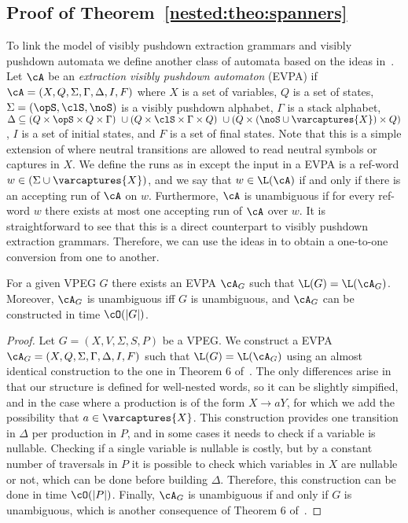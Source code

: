 
\subsection{Proof of Theorem~\ref{nested:theo:spanners}}

To link the model of visibly pushdown extraction grammars and visibly pushdown automata we define another class of automata based on the ideas in~\cite{liatpaper}. Let $\cA$ be an {\em extraction visibly pushdown automaton} (EVPA) if $\cA = (X,Q,\Sigma,\Gamma,\Delta,I,F)$ where $X$ is a set of variables, $Q$ is a set of states, $\Sigma = (\opS,\clS,\noS)$ is a visibly pushdown alphabet, $\Gamma$ is a stack alphabet, $\Delta \subseteq
(Q \times \opS \times Q \times \Gamma) \ \cup (Q \times \clS \times \Gamma \times Q) \ \cup (Q \times (\noS\cup\varcaptures{X}) \times Q)$, $I$ is a set of initial states, and $F$ is a set of final states. Note that this is a simple extension of \vpa where neutral transitions are allowed to read neutral symbols or captures in $X$. We define the runs as in \vpa except the input in a EVPA is a ref-word $w\in(\Sigma\cup\varcaptures{X})$, and we say that $w\in\L(\cA)$ if and only if there is an accepting run of $\cA$ on $w$. Furthermore, $\cA$ is unambiguous if for every ref-word $w$ there exists at most one accepting run of $\cA$ over $w$. It is straightforward to see that this is a direct counterpart to visibly pushdown extraction grammars. Therefore, we can use the ideas in \cite{AlurM04} to obtain a one-to-one conversion from one to another.

\begin{claim}\label{nested:appendix:spannerclaim}
	For a given VPEG $G$ there exists an EVPA $\cA_G$ such that $\L(G) = \L(\cA_G)$. Moreover, $\cA_G$ is unambiguous iff $G$ is unambiguous, and $\cA_G$ can be constructed in time $\cO(\vert G\vert)$.
\end{claim}
\begin{proof}
	Let $G = (X, V, \Sigma, S, P)$ be a VPEG. We construct a EVPA $\cA_G = (X,Q,\Sigma,\Gamma,\Delta,I,F)$ such that $\L(G) = \L(\cA_G)$ using an almost identical construction to the one in Theorem 6 of~\cite{AlurM04}. The only differences arise in that our structure is defined for well-nested words, so it can be slightly simpified, and in the case where a production is of the form $X\to aY$, for which we add the possibility that $a\in\varcaptures{X}$. This construction provides one transition in $\Delta$ per production in $P$, and in some cases it needs to check if a variable is nullable. Checking if a single variable is nullable is costly, but by a constant number of traversals in $P$ it is possible to check which variables in $X$ are nullable or not, which can be done before building $\Delta$. Therefore, this construction can be done in time $\cO(\vert P\vert)$. Finally, $\cA_G$ is unambiguous if and only if $G$ is unambiguous, which is another consequence of Theorem 6 of~\cite{AlurM04}.	
\end{proof}

